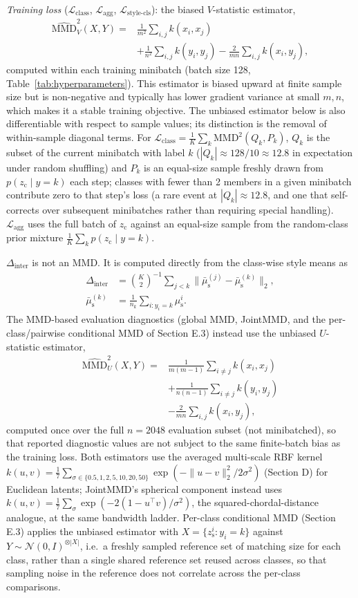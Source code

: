 \documentclass[letterpaper]{article} %
\newcommand{\zc}{z_{\mathrm{c}}}
\newcommand{\zs}{z_{\mathrm{s}}}
\newcommand{\mus}{\mu_{\mathrm{s}}}
\newcommand{\MMD}{\mathrm{MMD}}
\newcommand{\Dinter}{\Delta_{\mathrm{inter}}}
\begin{document}
\emph{Training loss} ($\mathcal L_{\mathrm{class}}$, $\mathcal L_{\mathrm{agg}}$,
$\mathcal L_{\mathrm{style\text{-}cls}}$): the biased $V$-statistic estimator,
\[
\begin{aligned}
\widehat{\MMD}^2_V(X,Y)={}&\tfrac1{m^2}\!\sum_{i,j}k(x_i,x_j)\\
&+\tfrac1{n^2}\!\sum_{i,j}k(y_i,y_j)
-\tfrac2{mn}\!\sum_{i,j}k(x_i,y_j),
\end{aligned}
\]
computed within each training minibatch (batch size 128,
Table~\ref{tab:hyperparameters}). This estimator is biased upward at finite
sample size but is non-negative and typically has lower gradient variance at
small $m,n$, which makes it a stable training objective. The unbiased
estimator below is also differentiable with respect to sample values; its
distinction is the removal of within-sample diagonal terms. For
$\mathcal L_{\mathrm{class}}=\frac1K\sum_k\MMD^2(Q_k,P_k)$, $Q_k$ is the
subset of the current minibatch with label $k$ ($|Q_k|\approx128/10\approx12.8$
in expectation under random shuffling) and $P_k$ is an equal-size sample
freshly drawn from $p(\zc\mid y{=}k)$ each step; classes with fewer than 2
members in a given minibatch contribute zero to that step's loss (a rare
event at $|Q_k|\approx12.8$, and one that self-corrects over subsequent
minibatches rather than requiring special handling). $\mathcal L_{\mathrm{agg}}$
uses the full batch of $\zc$ against an equal-size sample from the random-class
prior mixture $\frac1K\sum_k p(\zc\mid y{=}k)$.

$\Dinter$ is not an MMD. It is computed directly from the class-wise style
means as
\begin{align*}
\Dinter&=\binom{K}{2}^{-1}\sum_{j<k}
\|\bar\mus^{(j)}-\bar\mus^{(k)}\|_2,\\
\bar\mus^{(k)}&=\frac{1}{n_k}\sum_{i:y_i=k}\mus^i.
\end{align*}
The MMD-based evaluation diagnostics (global MMD, JointMMD, and the
per-class/pairwise conditional MMD of Section E.3) instead use the unbiased
$U$-statistic estimator,
\[
\begin{aligned}
\widehat{\MMD}^2_U(X,Y)={}&\tfrac1{m(m-1)}\!\sum_{i\ne j}k(x_i,x_j)\\
&+\tfrac1{n(n-1)}\!\sum_{i\ne j}k(y_i,y_j)\\
&-\tfrac2{mn}\!\sum_{i,j}k(x_i,y_j),
\end{aligned}
\]
computed once over the full $n{=}2048$ evaluation subset (not minibatched),
so that reported diagnostic values are not subject to the same finite-batch
bias as the training loss. Both estimators use the averaged multi-scale RBF kernel
$k(u,v)=\frac1{7}\sum_{\sigma\in\{0.5,1,2,5,10,20,50\}}\exp(-\|u-v\|_2^2/2\sigma^2)$
(Section D) for Euclidean latents; JointMMD's spherical component instead
uses $k(u,v)=\frac1{7}\sum_\sigma\exp(-2(1-u^\top v)/\sigma^2)$, the
squared-chordal-distance analogue, at the same bandwidth ladder. Per-class conditional MMD
(Section E.3) applies the unbiased estimator with $X=\{\zs^i:y_i{=}k\}$
against $Y\sim\mathcal N(0,I)^{\otimes|X|}$, i.e.\ a freshly sampled reference
set of matching size for each class, rather than a single shared reference
set reused across classes, so that sampling noise in the reference does not
correlate across the per-class comparisons.
\end{document}
